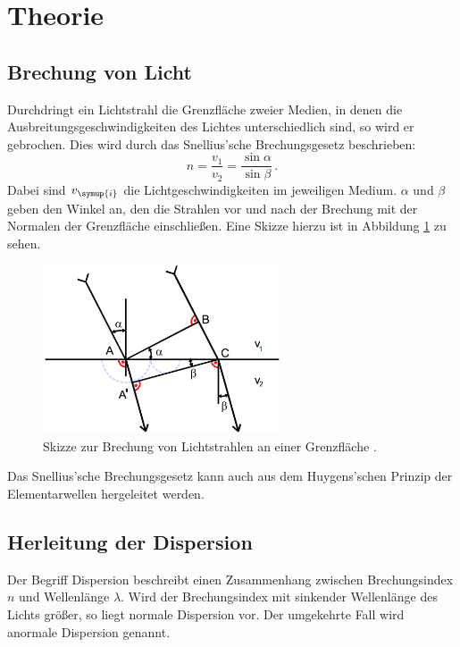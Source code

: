 \section{Theorie}
\label{sec:Theorie}
\subsection{Brechung von Licht}
\label{subsec:brechung}
Durchdringt ein Lichtstrahl die Grenzfläche zweier Medien, in denen die Ausbreitungsgeschwindigkeiten
des Lichtes unterschiedlich sind, so wird er gebrochen. Dies wird durch das Snellius'sche
Brechungsgesetz beschrieben:
\begin{equation}
  n=\frac{v_1}{v_2}=\frac{\sin{\alpha}}{\sin{\beta}} \,.
  \label{eqn:snelluis}
\end{equation}
Dabei sind $v_{\symup{i}}$ die Lichtgeschwindigkeiten im jeweiligen Medium. $\alpha$
und $\beta$ geben den Winkel an, den die Strahlen vor und nach der Brechung mit der
Normalen der Grenzfläche einschließen. Eine Skizze hierzu ist in Abbildung \ref{fig:brechung}
zu sehen.

\begin{figure}[H]
  \centering
  \includegraphics[height=5cm]{data/brechung.png}
  \caption{Skizze zur Brechung von Lichtstrahlen an einer Grenzfläche \cite{Versuchsanleitung}.}
  \label{fig:brechung}
\end{figure}

Das Snellius'sche Brechungsgesetz kann auch aus dem Huygens'schen Prinzip der Elementarwellen
hergeleitet werden.

\subsection{Herleitung der Dispersion}
\label{subsec:dispersion1}
Der Begriff Dispersion beschreibt einen Zusammenhang zwischen Brechungsindex $n$ und
Wellenlänge $\lambda$. Wird der Brechungsindex mit sinkender Wellenlänge des Lichts
größer, so liegt normale Dispersion vor. Der umgekehrte Fall wird anormale Dispersion
genannt.

